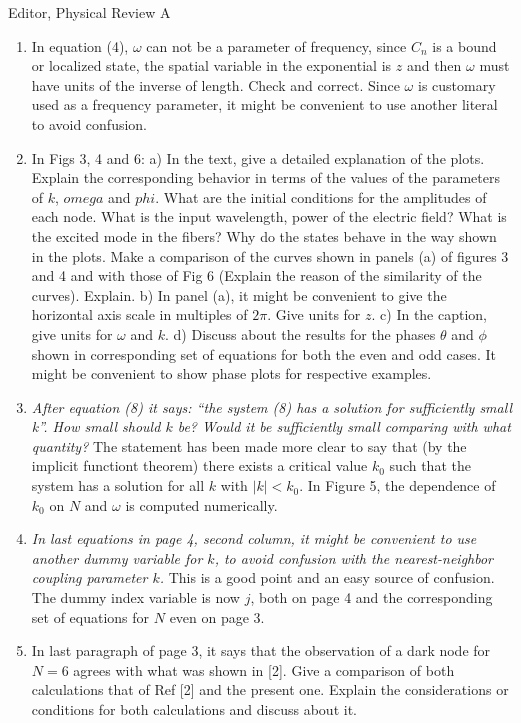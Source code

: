\documentclass[11pt]{letter}
\begin{document}
\begin{letter}{Editor, Physical Review A}
\begin{enumerate}
\item In equation (4), $\omega$ can not be a parameter of frequency, since $C_n$ is a bound or localized state, the spatial variable in the exponential is $z$ and then $\omega$ must have units of the inverse of length. Check and correct. Since $\omega$ is customary used as a frequency parameter, it might be convenient to use another literal to avoid confusion.

\item In Figs 3, 4 and 6: a) In the text, give a detailed explanation of the plots. Explain the corresponding behavior in terms of the values
of the parameters of $k$, $omega$ and $phi$. What are the initial conditions for the amplitudes of each node. What is the input wavelength, power of the electric field? What is the excited mode in the fibers? Why do the states behave in the way shown in the plots.  Make a comparison of the curves shown in panels (a) of figures 3 and 4 and with those of Fig 6 (Explain the reason of the similarity of the curves). Explain. b) In panel (a), it might be convenient to give the horizontal axis scale in multiples of $2\pi$. Give units for $z$. c) In the caption, give units for $\omega$ and $k$. d) Discuss about the results for the phases $\theta$ and $\phi$ shown in corresponding set of equations for both the even and odd cases. It might be convenient to
show phase plots for respective examples.

\item \emph{After equation (8) it says: ``the system (8) has a solution for sufficiently small k''. How small should $k$ be? Would it be sufficiently small comparing with what quantity?} The statement has been made more clear to say that (by the implicit functiont theorem) there exists a critical value $k_0$ such that the system has a solution for all $k$ with $|k| < k_0$. In Figure 5, the dependence of $k_0$ on $N$ and $\omega$ is computed numerically.

\item \emph{In last equations in page 4, second column, it might be convenient to use another dummy variable for $k$, to avoid confusion with the nearest-neighbor coupling parameter $k$.} This is a good point and an easy source of confusion. The dummy index variable is now $j$, both on page 4 and the corresponding set of equations for $N$ even on page 3.

\item In last paragraph of page 3, it says that the observation of a dark node for $N=6$ agrees with what was shown in [2]. Give a comparison of both calculations that of Ref [2] and the present one. Explain the considerations or conditions for both calculations and discuss about it.


\end{enumerate}
\end{letter}
\end{document}
